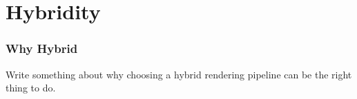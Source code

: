
\part{Hybridity}
\section{Why Hybrid}

Write something about why choosing a hybrid rendering pipeline can be the right thing to do.
